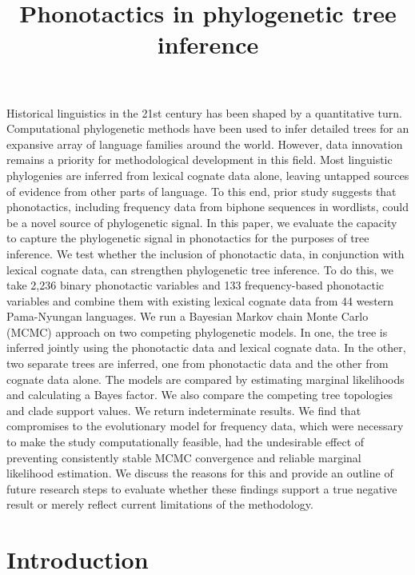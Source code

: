 \documentclass[]{article}
\title{Phonotactics in phylogenetic tree inference}
\author{}
\date{\vspace{-2.5em}}
\begin{document}
\maketitle

Historical linguistics in the 21st century has been shaped by a quantitative turn. Computational phylogenetic methods have been used to infer detailed trees for an expansive array of language families around the world. However, data innovation remains a priority for methodological development in this field. Most linguistic phylogenies are inferred from lexical cognate data alone, leaving untapped sources of evidence from other parts of language. To this end, prior study suggests that phonotactics, including frequency data from biphone sequences in wordlists, could be a novel source of phylogenetic signal. In this paper, we evaluate the capacity to capture the phylogenetic signal in phonotactics for the purposes of tree inference. We test whether the inclusion of phonotactic data, in conjunction with lexical cognate data, can strengthen phylogenetic tree inference. To do this, we take 2,236 binary phonotactic variables and 133 frequency-based phonotactic variables and combine them with existing lexical cognate data from 44 western Pama-Nyungan languages. We run a Bayesian Markov chain Monte Carlo (MCMC) approach on two competing phylogenetic models. In one, the tree is inferred jointly using the phonotactic data and lexical cognate data. In the other, two separate trees are inferred, one from phonotactic data and the other from cognate data alone. The models are compared by estimating marginal likelihoods and calculating a Bayes factor. We also compare the competing tree topologies and clade support values. We return indeterminate results. We find that compromises to the evolutionary model for frequency data, which were necessary to make the study computationally feasible, had the undesirable effect of preventing consistently stable MCMC convergence and reliable marginal likelihood estimation. We discuss the reasons for this and provide an outline of future research steps to evaluate whether these findings support a true negative result or merely reflect current limitations of the methodology.

\hypertarget{pn-tree-intro}{%
\section{Introduction}\label{pn-tree-intro}}
\end{document}
